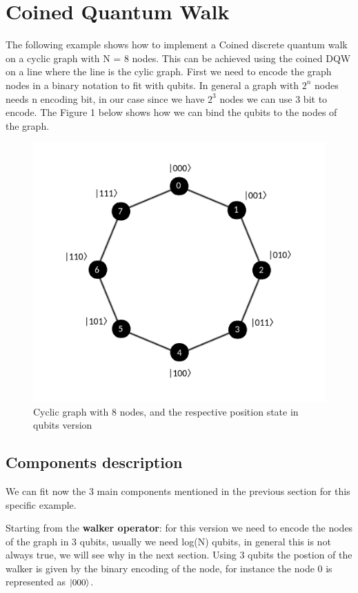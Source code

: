 \section{Coined Quantum Walk}

The following example shows how to implement a Coined discrete quantum walk on a cyclic graph with N = 8 nodes. This can be achieved using the coined DQW on a line
where the line is the cylic graph. First we need to encode the graph nodes in a binary notation to fit with qubits. In general a graph with $2^{n}$ nodes needs n encoding 
bit, in our case since we have $2^{3}$ nodes we can use 3 bit to encode. The Figure 1 below shows how we can bind the qubits to the nodes of the graph.

\begin{figure}[h!]
    \includegraphics[scale=0.3]{img/cyclic_graph.png}
    \caption{Cyclic graph with 8 nodes, and the respective position state in qubits version}
    \centering
\end{figure}

\subsection{Components description}

We can fit now the 3 main components mentioned in the previous section for this specific example. 

Starting from the \textbf{walker operator}: for this version we need to encode the nodes of the graph in 3 qubits, usually we need log(N) qubits, in general this is not always true, 
we will see why in the next section. Using 3 qubits the postion of the walker is given by the binary encoding of the node, for instance the node 0 is represented as $\ket{000}$.

